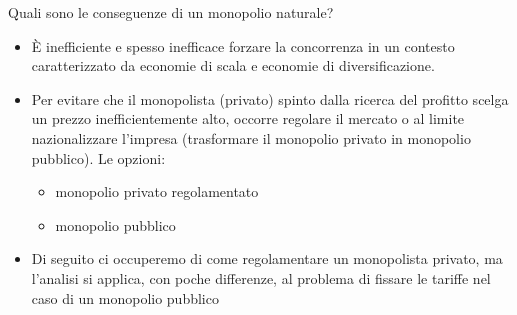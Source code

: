 \documentclass[aspectratio=64,11pt]{beamer}
\begin{document}
\begin{frame}{Quali sono le conseguenze di un monopolio naturale?}
\begin{itemize}
\item È inefficiente e spesso inefficace forzare la concorrenza in un contesto
caratterizzato da economie di scala e economie di diversificazione.

\item Per evitare che il monopolista (privato) spinto dalla ricerca del profitto
scelga un prezzo inefficientemente alto, occorre \alert{regolare} il mercato o al
limite \alert{nazionalizzare} l'impresa (trasformare il monopolio privato in
monopolio pubblico). Le opzioni:
\begin{itemize}
\item monopolio privato regolamentato
\item monopolio pubblico
\end{itemize}

\item Di seguito ci occuperemo di come regolamentare un monopolista privato, ma
l'analisi si applica, con poche differenze, al problema di fissare le
tariffe nel caso di un monopolio pubblico
\end{itemize}
\end{frame}
\end{document}
